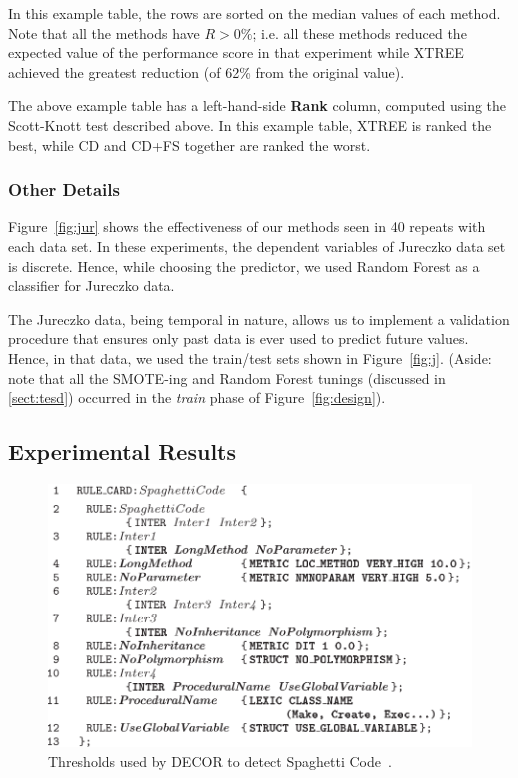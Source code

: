 \documentclass{sig-alternate}
\newcommand{\tion}[1]{\textsection\ref{sect:#1}}
\newcommand{\fig}[1]{Figure~\ref{fig:#1}}
\begin{document}
In this example table, the rows are  sorted on the median values of each method. Note that all the methods have $R\gt0\%$; i.e. all these methods reduced the expected value of the performance score in that experiment while XTREE achieved the greatest reduction (of 62\% from the original value).

The above example table has a  left-hand-side  {\bf Rank} column, computed using the
Scott-Knott test described above. In this example table, XTREE is ranked the best, while CD and CD+FS together are ranked the worst.

\subsubsection{Other Details}
 
\fig{jur} shows the effectiveness of our methods seen in 40 repeats with each data set.
In these experiments,   the dependent variables of Jureczko data set is discrete. Hence, while choosing the predictor, we used Random Forest as a classifier for Jureczko data.

The Jureczko data, being temporal in nature, allows us to implement a validation procedure that ensures only past data is ever used to predict future values. Hence, in that data, we used the train/test sets shown in \fig{j}. (Aside: note  that all the SMOTE-ing and Random Forest tunings (discussed in \tion{tesd}) occurred in the {\em train} phase of \fig{design}).



\subsection{Experimental Results}

\begin{figure}[tb!]
\centering
\includegraphics[width=\linewidth]{figs/thresh.png}
\caption{Thresholds used by DECOR to detect Spaghetti Code~\cite{moha10}.}\label{fig:thresh}
\end{figure}
\end{document}
